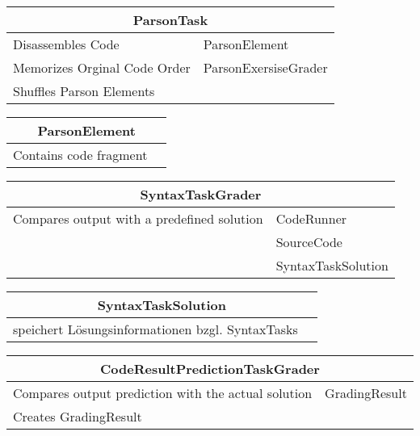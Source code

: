 \documentclass[11pt]{article}
\begin{document}
\begin{table}[h]
\begin{tabularx}{\textwidth}{|X|X|}
\hline
\multicolumn{2}{|c|}{ParsonTask}\\ \hline
Disassembles Code& ParsonElement  \\  \hline
Memorizes Orginal Code Order & ParsonExersiseGrader\\ \hline
Shuffles Parson Elements & \\ \hline
\end{tabularx}

\end{table}


\begin{table}[h]
\begin{tabularx}{\textwidth}{|X|X|}
\hline
\multicolumn{2}{|c|}{ParsonElement}\\ \hline
Contains code fragment& \\  \hline
\end{tabularx}

\end{table}


\begin{table}[h]
\begin{tabularx}{\textwidth}{|X|X|}
\hline
\multicolumn{2}{|c|}{SyntaxTaskGrader}\\ \hline
Compares output with a predefined solution& CodeRunner \\  \hline
 &  SourceCode\\ \hline
 & SyntaxTaskSolution\\ \hline
\end{tabularx}

\end{table}

\begin{table}[h]
\begin{tabularx}{\textwidth}{|X|X|}
\hline
\multicolumn{2}{|c|}{SyntaxTaskSolution}\\ \hline
speichert Lösungsinformationen bzgl. SyntaxTasks& \\  \hline
\end{tabularx}

\end{table}




\begin{table}[h]
\begin{tabularx}{\textwidth}{|X|X|}
\hline
\multicolumn{2}{|c|}{CodeResultPredictionTaskGrader}\\ \hline
Compares output prediction with the actual solution& GradingResult  \\  \hline
Creates GradingResult &  \\ \hline
\end{tabularx}

\end{table}
\end{document}
